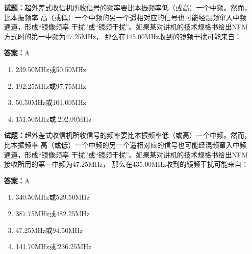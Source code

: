 \documentclass{ctexbook}
\begin{document}





\vspace{1em}

\textbf{试题：}超外差式收信机所收信号的频率要比本振频率低（或高）一个中频。然而，比本振频率
高（或低）一个中频的另一个遥相对应的信号也可能经混频窜入中频通道，形成“镜像频率
干扰”或“镜频干扰”。如果某对讲机的技术规格书给出NFM方式时的第一中频为47.25MHz，
那么在145.00MHz收到的镜频干扰可能来自： 

\textbf{答案：}A 

\begin{enumerate}[leftmargin=3em]
  \item 239.50MHz或50.50MHz 

  \item 192.25MHz或97.75MHz 

  \item 50.50MHz或101.00MHz 

  \item 151.50MHz或.202.00MHz 

\end{enumerate}





\vspace{1em}

\textbf{试题：}超外差式收信机所收信号的频率要比本振频率低（或高）一个中频。然而，比本振频率
高（或低）一个中频的另一个遥相对应的信号也可能经混频窜入中频通道，形成“镜像频率
干扰”或“镜频干扰”。如果某对讲机的技术规格书给出NFM接收所用的第一中频为47.25MHz，
那么在435.00MHz收到的镜频干扰可能来自： 

\textbf{答案：}A 

\begin{enumerate}[leftmargin=3em]
  \item 340.50MHz或529.50MHz 

  \item 387.75MHz或482.25MHz 

  \item 47.25MHz或94.50MHz 

  \item 141.70MHz或.236.25MHz 

\end{enumerate}

\end{document}
